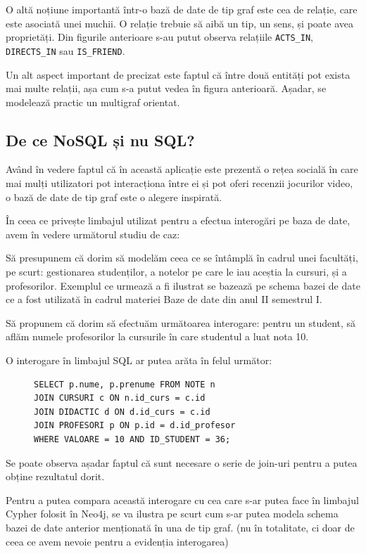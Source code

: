 \documentclass[12pt,a4paper]{report}
\begin{document}
O altă noțiune importantă într-o bază de date de tip graf este cea de relație, care este asociată unei muchii. 
O relație trebuie să aibă un tip, un sens, și poate avea proprietăți.
Din figurile anterioare s-au putut observa relațiile \texttt{ACTS\_IN}, \texttt{DIRECTS\_IN} sau \texttt{IS\_FRIEND}.

Un alt aspect important de precizat este faptul că între două entități pot exista mai multe relații, așa cum s-a putut vedea în figura anterioară. Așadar, se modelează practic un multigraf orientat.

\subsection{De ce NoSQL și nu SQL?}

Având în vedere faptul că în această aplicație este prezentă o rețea socială în care mai mulți utilizatori pot interacționa între ei și pot oferi recenzii jocurilor video, o bază de date de tip graf este o alegere inspirată.

În ceea ce privește limbajul utilizat pentru a efectua interogări pe baza de date, avem în vedere următorul studiu de caz:

Să presupunem că dorim să modelăm ceea ce se întâmplă în cadrul unei facultăți, pe scurt: gestionarea studenților, a notelor pe care le iau aceștia la cursuri, și a profesorilor.
Exemplul ce urmează a fi ilustrat se bazează pe schema bazei de date ce a fost utilizată în cadrul materiei Baze de date din anul II semestrul I. \cite{7}

Să propunem că dorim să efectuăm următoarea interogare: pentru un student, să aflăm numele profesorilor la cursurile în care studentul a luat nota 10.

O interogare în limbajul SQL ar putea arăta în felul următor:

\begin{figure}[H]
\centering
\begin{BVerbatim}
SELECT p.nume, p.prenume FROM NOTE n 
JOIN CURSURI c ON n.id_curs = c.id
JOIN DIDACTIC d ON d.id_curs = c.id
JOIN PROFESORI p ON p.id = d.id_profesor
WHERE VALOARE = 10 AND ID_STUDENT = 36;
\end{BVerbatim}
\end{figure}


Se poate observa așadar faptul că sunt necesare o serie de join-uri pentru a putea obține rezultatul dorit.


Pentru a putea compara această interogare cu cea care s-ar putea face în limbajul Cypher folosit în Neo4j, se va ilustra pe scurt cum s-ar putea modela schema bazei de date anterior menționată în una de tip graf. (nu în totalitate, ci doar de ceea ce avem nevoie pentru a evidenția interogarea)
\end{document}
